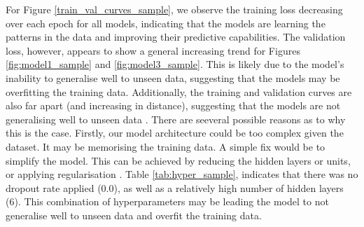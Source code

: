 For Figure \ref{train_val_curves_sample}, we observe the training loss decreasing over each epoch for all models, indicating that the models are learning the patterns in the data and improving their predictive capabilities. The validation loss, however, appears to show a general increasing trend for Figures \ref{fig:model1_sample} and \ref{fig:model3_sample}. This is likely due to the model's inability to generalise well to unseen data, suggesting that the models may be overfitting the training data. Additionally, the training and validation curves are also far apart (and increasing in distance), suggesting that the models are not generalising well to unseen data \cite{diaz2017effective}. There are seeveral possible reasons as to why this is the case. Firstly, our model architecture could be too complex given the dataset. It may be memorising the training data. A simple fix would be to simplify the model. This can be achieved by reducing the hidden layers or units, or applying regularisation \cite{bergstra2011algorithms}. Table \ref{tab:hyper_sample}, indicates that there was no dropout rate applied (0.0), as well as a relatively high number of hidden layers (6). This combination of hyperparameters may be leading the model to not generalise well to unseen data and overfit the training data. 

